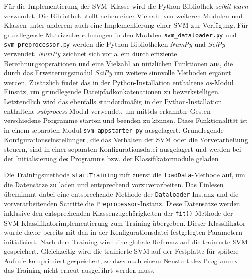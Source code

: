 Für die Implementierung der \ac{SVM}--Klasse wird die Python-Bibliothek \textit{scikit-learn} verwendet. 
Die Bibliothek stellt neben einer Vielzahl von weiteren Modulen und Klassen unter anderem auch eine Implementierung einer \ac{SVM} zur Verfügung.
Für grundlegende Matrizenberechnungen in den Modulen \texttt{svm\_dataloader.py} und \texttt{svm\_preprocessor.py} werden die Python-Bibliotheken \textit{NumPy} und \textit{SciPy} verwendet. 
\textit{NumPy} zeichnet sich vor allem durch effiziente Berechnungsoperationen und eine Vielzahl an nützlichen Funktionen aus, die durch das Erweiterungsmodul \textit{SciPy} um weitere sinnvolle Methoden ergänzt werden.
Zusätzlich findet das in der Python-Installation enthaltene \textit{os}-Modul Einsatz, um grundlegende Dateipfadkonkatenationen zu bewerkstelligen.
Letztendlich wird das ebenfalls standardmäßig in der Python-Installation enthaltene \textit{subprocess}-Modul verwendet, um mittels erkannter Gesten verschiedene Programme starten und beenden zu können.
Diese Funktionalität ist in einem separaten Modul \texttt{svm\_appstarter.py} ausgelagert.
Grundlegende Konfigurationseinstellungen, die das Verhalten der \ac{SVM} oder die Vorverarbeitung steuern, sind in einer separaten Konfigurationsdatei ausgelagert und werden bei der Initialisierung des Programms bzw. der Klassifikatormodule geladen.

Die Trainingsmethode \texttt{startTraining} ruft zuerst die \texttt{loadData}-Methode auf, um die Datensätze zu laden und entsprechend vorzuverarbeiten.
Das Einlesen übernimmt dabei eine entsprechende Methode der \texttt{Dataloader}-Instanz und die vorverarbeitenden Schritte die \texttt{Preprocessor}-Instanz.
Diese Datensätze werden inklusive den entsprechenden Klassenzugehörigkeiten der \texttt{fit()}-Methode der \ac{SVM}-Klassifikatorimplementierung zum Training übergeben.
Dieser Klassifikator wurde davor bereits mit den in der Konfigurationsdatei festgelegten Parametern initialisiert.
Nach dem Training wird eine globale Referenz auf die trainierte \ac{SVM} gespeichert.
Gleichzeitig wird die trainierte \ac{SVM} auf der Festplatte für spätere Aufrufe komprimiert gespeichert, so dass nach einem Neustart des Programms das Training nicht erneut ausgeführt werden muss.

